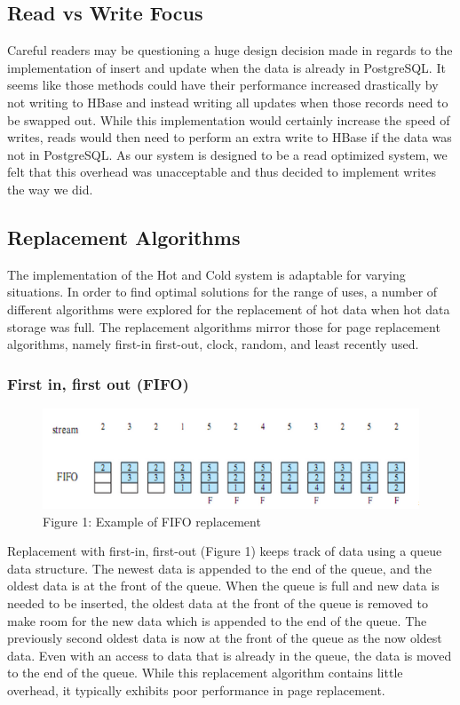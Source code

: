 \documentclass[12pt]{article}
\begin{document}
\subsection{Read vs Write Focus}  
Careful readers may be questioning a huge design decision made in regards to the implementation of insert and update when the data is already in PostgreSQL. It seems like those methods could have their performance increased drastically by not writing to HBase and instead writing all updates when those records need to be swapped out. While this implementation would certainly increase the speed of writes, reads would then need to perform an extra write to HBase if the data was not in PostgreSQL. As our system is designed to be a read optimized system, we felt that this overhead was unacceptable and thus decided to implement writes the way we did. 

\subsection{Replacement Algorithms}
The implementation of the Hot and Cold system is adaptable for varying situations. In order to find optimal solutions for the range of uses, a number of different algorithms were explored for the replacement of hot data when hot data storage was full. The replacement algorithms mirror those for page replacement algorithms, namely first-in first-out, clock, random, and least recently used.

\subsubsection{First in, first out (FIFO)}
   
\begin{figure}[h]
\centering
\includegraphics[width=\columnwidth]{FIFO}
\caption{Figure 1: Example of FIFO replacement \cite{10}}
\end{figure}

Replacement with first-in, first-out (Figure 1) keeps track of data using a queue data structure. The newest data is appended to the end of the queue, and the oldest data is at the front of the queue. When the queue is full and new data is needed to be inserted, the oldest data at the front of the queue is removed to make room for the new data which is appended to the end of the queue. The previously second oldest data is now at the front of the queue as the now oldest data. Even with an access to data that is already in the queue, the data is moved to the end of the queue. While this replacement algorithm contains little overhead, it typically exhibits poor performance in page replacement.
\end{document}

